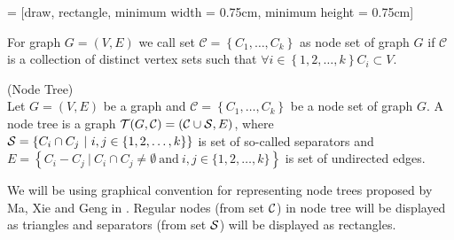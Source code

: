 %
%




 = [draw, rectangle, minimum width = 0.75cm, minimum height = 0.75cm]




For graph $G = (V, E)$ we call set $\mathcal{C} = \left\{ C_1, \dots, C_k\right\}$  
as node set of graph $G$ if $\mathcal{C}$ is a collection of distinct vertex sets such that 
$\forall i \in \left\{1, 2, \dots, k \right\} C_i \subset V$.


\begin{defi} (Node Tree) \\ 
	Let $G = (V, E)$ be a graph and $\mathcal{C} = \left\{ C_1, \dots, C_k\right\}$ be a node set of graph $G$.
	A node tree is a graph $\mathcal{T}(G, \mathcal{C}) = (\mathcal{C} \cup \mathcal{S}, E)$, where 
	$\mathcal{S} = \left\{ C_i \cap C_j \ | \ i, j \in \{1, 2, \dots, k\} \right\}$ is set of so-called separators 
	and $E = \left\{ C_i - C_j \ | \ C_i \cap C_j \neq \emptyset \ \mbox{and} \ i, j \in \{1, 2, \dots, k \} \right\}$ 
	is set of undirected edges.
\end{defi}

We will be using graphical convention for representing node trees proposed by Ma, Xie and Geng in \cite{CG}. Regular nodes (from set $\mathcal{C}$) in node tree will be displayed as triangles and separators (from set $\mathcal{S}$) will be displayed as rectangles.


